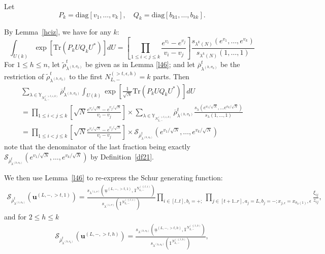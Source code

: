 \documentclass[11pt]{amsart}
\theoremstyle{plain}
\theoremstyle{definition}
\theoremstyle{remark}
\newcommand\ol{\overline}
\newcommand\si{\sigma}
\newcommand\YY{\mathbb{Y}}
\numberwithin{equation}{section}
\numberwithin{theorem}{section}
\numberwithin{figure}{section}
\begin{document}
Let
\begin{equation*}
  P_{k}=\mathrm{diag}\left[v_1,\ldots,v_k\right],\quad
  Q_k=\mathrm{diag}\left[b_{k1},\ldots,b_{kk}\right].
\end{equation*}

By Lemma~\ref{hciz}, we have for any $k$:
\begin{equation}
  \label{lg0}
  \int_{U(k)}\exp\left[\mathrm{Tr}\left(P_k U Q_kU^*\right)\right]dU=
  \left[\prod_{1\leq i<j\leq k}\frac{e^{v_i}-e^{v_j}}{v_i-v_j}\right]
  \frac{s_{\lambda^{k}(N)}(e^{v_1},\ldots,e^{v_k})}{s_{\lambda^k(N)}(1,\ldots,1)}
\end{equation}
For $1\leq h\leq n$, let $\tilde{\rho}^t_{\lambda^{(h,\si_0)}}$ be given as in Lemma \ref{l46}; and let $\ol{\rho}^t_{\lambda^{(h,\si_0)}}$ be the restriction of $\tilde{\rho}^t_{\lambda^{(h,\si_0)}}$ to the first $N_{L,-}^{(>t,\epsilon,h)}=k$ parts.
Then
\begin{multline}
\label{lg1}
\sum_{\lambda\in \YY_{N_{L,-}^{(>t,\epsilon,h)}}}\ol{\rho}^t_{\lambda^{(h,\si_0)}}\int_{U(k)}\exp\left[\frac{1}{\sqrt{N}}\mathrm{Tr}\left(P_kUQ_kU^*\right)\right]dU\\
=\prod_{1\leq i<j\leq k}
\left[\sqrt{N}\frac{e^{v_i/\sqrt{N}}-e^{v_j/\sqrt{N}}}{v_i-v_j}\right] \times
\sum_{\lambda\in \YY_{N_{L,-}^{(>t,\epsilon,h)}}}\ol{\rho}^t_{\lambda^{(h,\si_0)}}
\frac{s_{\lambda}(e^{v_1/\sqrt{N}},\dotsc e^{v_k
  /\sqrt{N}})}{s_{\lambda}(1,\dotsc,1)}\\
  =
  \prod_{1\leq i<j\leq k}
\left[\sqrt{N}\frac{e^{v_i/\sqrt{N}}-e^{v_j/\sqrt{N}}}{v_i-v_j}\right] \times
  \mathcal{S}_{\ol{\rho}^t_{\lambda^{(h,\si_0)}}}(e^{v_1/\sqrt{N}},\dotsc,e^{v_k/\sqrt{N}})
\end{multline}
note that the denominator of the last fraction being exactly 
$\mathcal{S}_{\ol{\rho}^t_{\lambda^{(h,\si_0)}}}(e^{v_1/\sqrt{N}},\dotsc,e^{v_k/\sqrt{N}})$
by Definition~\ref{df21}.


We then use Lemma~\ref{l46} to re-express the Schur generating function:
\begin{align*}
\mathcal{S}_{\ol{\rho}^t_{\lambda^{(1,\si_0)}}}(\mathbf{u}^{(L,-,>t,1)})
=
\frac{s_{\lambda^{(1,\sigma)}}\left(\underline{u}^{(L,-,>t,1)},1^{N_{L,-}^{(\leq t,1)}}\right)}{s_{\lambda^{(1,\sigma)}}\left(1^{N_{L,-}^{(\leq t,1)}}\right)}
\prod_{i\in[l..t],b_i=+;}\prod_{j\in[t+1..r],a_j=L,b_j=-;x_{j,\epsilon}=x_{\si_0(1)},\epsilon}\frac{\xi_{ij}}{z_{ij}},
\end{align*}
and for $2\leq h\leq k$
\begin{align*}
\mathcal{S}_{\ol{\rho}^t_{\lambda^{(h,\si_0)}}}(\mathbf{u}^{(L,-,>t,h)})
=
\frac{s_{\lambda^{(h,\sigma_0)}}\left(\underline{u}^{(L,-,>t,h)},1^{N_{L,-}^{(\leq t,h)}}\right)}{s_{\lambda^{(h,\sigma_0)}}\left(1^{N_{L,-}^{(\leq t,h)}}\right)},
\end{align*}
\end{document}
